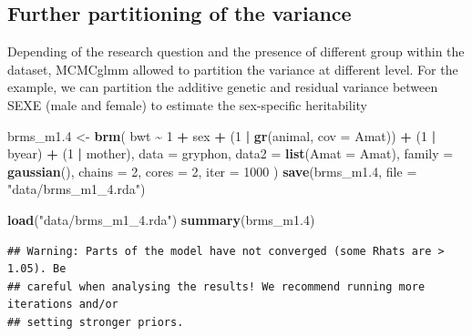 \documentclass[
  12pt,
]{book}
\newenvironment{Shaded}{\begin{snugshade}}{\end{snugshade}}
\newcommand{\DataTypeTok}[1]{\textcolor[rgb]{0.13,0.29,0.53}{#1}}
\newcommand{\DecValTok}[1]{\textcolor[rgb]{0.00,0.00,0.81}{#1}}
\newcommand{\FloatTok}[1]{\textcolor[rgb]{0.00,0.00,0.81}{#1}}
\newcommand{\KeywordTok}[1]{\textcolor[rgb]{0.13,0.29,0.53}{\textbf{#1}}}
\newcommand{\NormalTok}[1]{#1}
\newcommand{\OperatorTok}[1]{\textcolor[rgb]{0.81,0.36,0.00}{\textbf{#1}}}
\newcommand{\StringTok}[1]{\textcolor[rgb]{0.31,0.60,0.02}{#1}}
\begin{document}
\hypertarget{further-partitioning-of-the-variance}{%
\subsection{Further partitioning of the variance}\label{further-partitioning-of-the-variance}}

Depending of the research question and the presence of different group within the dataset, MCMCglmm allowed to partition the variance at different level. For the example, we can partition the additive genetic and residual variance between SEXE (male and female) to estimate the sex-specific heritability

\begin{Shaded}
\begin{Highlighting}[]
\NormalTok{brms\_m1}\FloatTok{.4}\NormalTok{ \textless{}{-}}\StringTok{ }\KeywordTok{brm}\NormalTok{(}
\NormalTok{  bwt }\OperatorTok{\textasciitilde{}}\StringTok{ }\DecValTok{1} \OperatorTok{+}\StringTok{ }\NormalTok{sex }\OperatorTok{+}\StringTok{ }\NormalTok{(}\DecValTok{1} \OperatorTok{|}\StringTok{ }\KeywordTok{gr}\NormalTok{(animal, }\DataTypeTok{cov =}\NormalTok{ Amat)) }\OperatorTok{+}\StringTok{ }\NormalTok{(}\DecValTok{1} \OperatorTok{|}\StringTok{ }\NormalTok{byear) }\OperatorTok{+}\StringTok{ }\NormalTok{(}\DecValTok{1} \OperatorTok{|}\StringTok{ }\NormalTok{mother),}
  \DataTypeTok{data =}\NormalTok{ gryphon,}
  \DataTypeTok{data2 =} \KeywordTok{list}\NormalTok{(}\DataTypeTok{Amat =}\NormalTok{ Amat),}
  \DataTypeTok{family =} \KeywordTok{gaussian}\NormalTok{(),}
  \DataTypeTok{chains =} \DecValTok{2}\NormalTok{, }\DataTypeTok{cores =} \DecValTok{2}\NormalTok{, }\DataTypeTok{iter =} \DecValTok{1000}
\NormalTok{)}
\KeywordTok{save}\NormalTok{(brms\_m1}\FloatTok{.4}\NormalTok{, }\DataTypeTok{file =} \StringTok{"data/brms\_m1\_4.rda"}\NormalTok{)}
\end{Highlighting}
\end{Shaded}

\begin{Shaded}
\begin{Highlighting}[]
\KeywordTok{load}\NormalTok{(}\StringTok{"data/brms\_m1\_4.rda"}\NormalTok{)}
\KeywordTok{summary}\NormalTok{(brms\_m1}\FloatTok{.4}\NormalTok{)}
\end{Highlighting}
\end{Shaded}

\begin{verbatim}
## Warning: Parts of the model have not converged (some Rhats are > 1.05). Be
## careful when analysing the results! We recommend running more iterations and/or
## setting stronger priors.
\end{verbatim}
\end{document}
